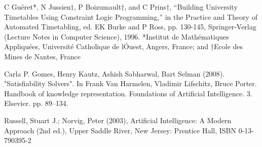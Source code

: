 \begin{thebibliography}{99}
C Gu\'eret*, N Jussien†, P Boizumault†, and C Prins†, “Building University Timetables Using Constraint Logic Programming,” in the Practice and Theory of Automated
Timetabling, ed. EK Burke and P Ross, pp. 130-145, Springer-Verlag (Lecture Notes
in Computer Science), 1996. *Institut de Math\'ematiques Appliqu\'ees, Universit\'e
Catholique de l\'Ouest, Angers, France; and †Ecole des Mines de Nantes, France

Carla P. Gomes, Henry Kautz, Ashish Sabharwal, Bart Selman (2008). "Satisfiability Solvers". In Frank Van Harmelen, Vladimir Lifschitz, Bruce Porter. Handbook of knowledge representation. Foundations of Artificial Intelligence. 3. Elsevier. pp. 89–134.

Russell, Stuart J.; Norvig, Peter (2003), Artificial Intelligence: A Modern Approach (2nd ed.), Upper Saddle River, New Jersey: Prentice Hall, ISBN 0-13-790395-2

\end{thebibliography}